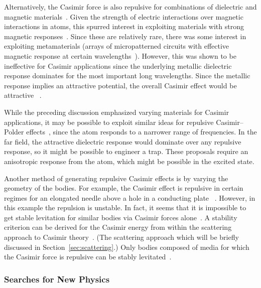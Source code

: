 Alternatively, the Casimir force is also repulsive for combinations of dielectric and magnetic materials~\cite{Boyer1974}.  
Given the strength of electric interactions over magnetic interactions in atoms, this spurred interest
in exploiting materials with strong magnetic responses~\cite{Kenneth2002}.  
Since these are relatively rare, there was some interest in exploiting metamaterials (arrays of micropatterned circuits with
effective magnetic response at certain wavelengths~\cite{Pendry1999}).  However, this was shown to be ineffective
for Casimir applications since the underlying metallic dielectric response dominates for the most important long wavelengths.
Since the metallic response implies an attractive potential, the overall Casimir effect would be attractive~
\cite{Ianuzzi2003comment,Rosa2008,Pirozhenko2008,Yannopapas2009}.  

While the preceding discussion emphasized varying materials for Casimir applications, it may 
be possible to exploit similar ideas for repulsive Casimir--Polder effects~\cite{Milton2011,Milton2012},
since the atom responds to a narrower range of frequencies.  In the far field, the attractive dielectric
response would dominate over any repulsive response, so it might be possible to engineer a trap.  
These proposals require an anisotropic response from the atom, which might be possible in the excited state.

Another method of generating repulsive Casimir effects is by varying the geometry of the bodies.  
For example, the Casimir effect is repulsive in certain regimes for an elongated needle above a hole in a conducting plate~
\cite{Levin2010,Rodriguez2013}.  However, in this example the repulsion is unstable. 
In fact, it seems that it is impossible to get stable levitation for similar bodies via Casimir forces alone~\cite{Rahi2010}.
A stability criterion can be derived for the Casimir energy from within the scattering approach to Casimir theory~\cite{Rahi2010,Rahi2011}.
(The scattering approach which will be briefly discussed in Section~\ref{sec:scattering}.)  Only bodies
composed of media for which the Casimir force is repulsive can be stably levitated~\cite{Rahi2011}.

\subsubsection{Searches for New Physics}


